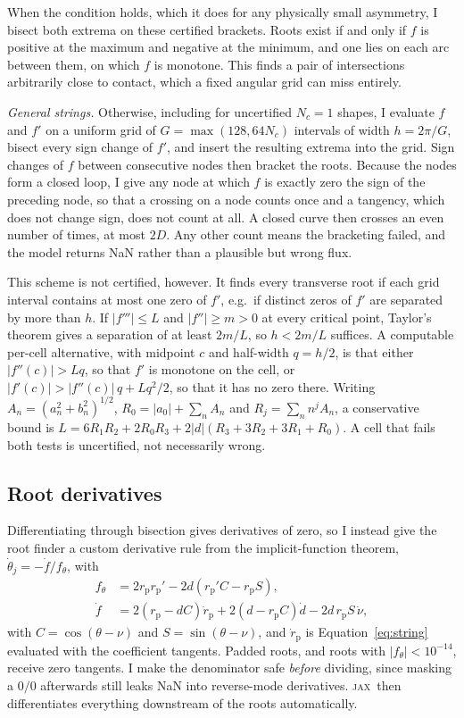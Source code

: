 \documentclass[twocolumn]{aastex701}
\newcommand{\jax}{\textsc{jax}}
\begin{document}
When the condition holds, which it does for any physically small
asymmetry, I bisect both extrema on these certified brackets. Roots exist
if and only if $f$ is positive at the maximum and negative at the minimum,
and one lies on each arc between them, on which $f$ is monotone. This
finds a pair of intersections arbitrarily close to contact, which a fixed
angular grid can miss entirely.

\textit{General strings.} Otherwise, including for uncertified $N_c=1$
shapes, I evaluate $f$ and $f'$ on a uniform grid of $G=\max(128, 64N_c)$
intervals of width $h=2\pi/G$, bisect every sign change of $f'$, and
insert the resulting extrema into the grid. Sign changes of $f$ between
consecutive nodes then bracket the roots. Because the nodes form a closed
loop, I give any node at which $f$ is exactly zero the sign of the
preceding node, so that a crossing on a node counts once and a tangency,
which does not change sign, does not count at all. A closed curve then
crosses an even number of times, at most $2D$. Any other count means the
bracketing failed, and the model returns NaN rather than a plausible but
wrong flux.

This scheme is not certified, however. It finds every transverse root if
each grid interval contains at most one zero of $f'$, e.g.\ if distinct zeros of
$f'$ are separated by more than $h$. If $|f'''|\leq L$ and
$|f''|\geq m>0$ at every critical point, Taylor's theorem gives a
separation of at least $2m/L$, so $h < 2m/L$ suffices. A computable
per-cell alternative, with midpoint $c$ and half-width $q=h/2$, is that
either $|f''(c)| > Lq$, so that $f'$ is monotone on the cell, or
$|f'(c)| > |f''(c)|\,q + Lq^2/2$, so that it has no zero there. Writing
$A_n = (a_n^2+b_n^2)^{1/2}$, $R_0 = |a_0| + \sum_n A_n$ and
$R_j = \sum_n n^j A_n$, a conservative bound is
$L = 6R_1R_2 + 2R_0R_3 + 2|d|(R_3+3R_2+3R_1+R_0)$. A cell that fails
both tests is uncertified, not necessarily wrong.

\subsection{Root derivatives} \label{sec:jvp}

Differentiating through bisection gives derivatives of zero, so I instead
give the root finder a custom derivative rule from the implicit-function
theorem, $\dot\theta_j = -\dot f/f_\theta$, with
\begin{align}
f_\theta &= 2 r_\mathrm{p} r_\mathrm{p}'
  - 2d\left(r_\mathrm{p}' C - r_\mathrm{p} S\right),\\
\dot f &= 2\left(r_\mathrm{p} - dC\right)\dot r_\mathrm{p}
  + 2\left(d - r_\mathrm{p} C\right)\dot d
  - 2 d\, r_\mathrm{p} S\,\dot\nu,
\end{align}
with $C = \cos(\theta-\nu)$ and $S = \sin(\theta-\nu)$, and
$\dot r_\mathrm{p}$ is Equation~\eqref{eq:string} evaluated with the
coefficient tangents. Padded roots, and roots with
$|f_\theta| < 10^{-14}$, receive zero tangents. I make the denominator
safe \emph{before} dividing, since masking a $0/0$ afterwards still leaks
NaN into reverse-mode derivatives. \jax\ then differentiates everything
downstream of the roots automatically.
\end{document}
